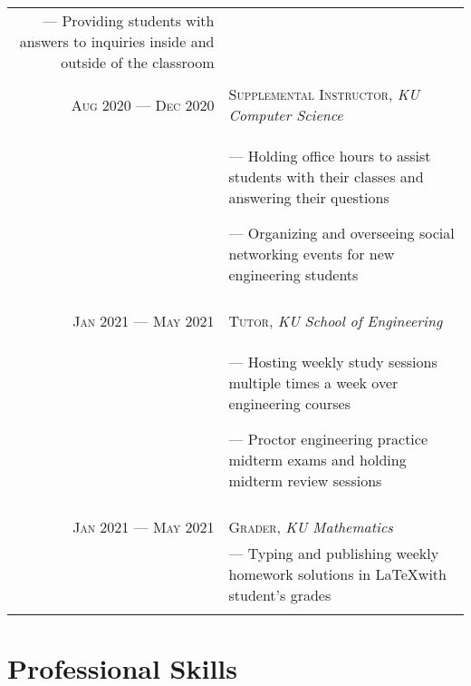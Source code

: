 \documentclass[a4paper, 10pt]{article}
\begin{document}
\begin{tabular}{r|p{12cm}}
{		--- Providing students with answers to inquiries inside and outside of the classroom
	}                                                                                                                            \\\multicolumn{2}{c}{}\\


	\textsc{Aug 2020 --- Dec 2020} & \textsc{Supplemental Instructor}, \emph{KU Computer Science}                                \\&\footnotesize{
		--- Holding office hours to assist students with their classes and answering their questions

		--- Organizing and overseeing social networking events for new engineering students
	}                                                                                                                            \\\multicolumn{2}{c}{}\\

	\textsc{Jan 2021 --- May 2021} & \textsc{Tutor}, \emph{KU School of Engineering}                                             \\&\footnotesize{
		--- Hosting weekly study sessions multiple times a week over engineering courses

		--- Proctor engineering practice midterm exams and holding midterm review sessions
	}                                                                                                                            \\\multicolumn{2}{c}{}\\

	\textsc{Jan 2021 --- May 2021} & \textsc{Grader}, \emph{KU Mathematics}                                                      \\&\footnotesize{
		--- Typing and publishing weekly homework solutions in \LaTeX with student's grades
	}                                                                                                                            \\\multicolumn{2}{c}{}\\
\end{tabular}

\section{Professional Skills}
\end{document}
